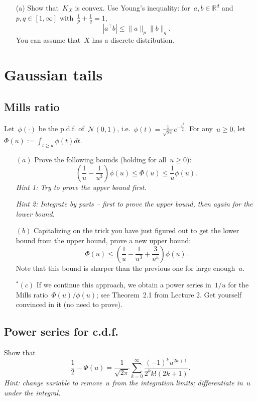 \documentclass[11pt]{article}
\newcommand{\R}{\mathds{R}}
\newcommand{\cN}{\mathcal{N}}
\newcommand{\leqs}{\leqslant}
\newcommand{\geqs}{\geqslant}
\renewcommand{\le}{\leqs}
\renewcommand{\ge}{\geqs}
\begin{document}
\begin{itemize}
\item[(a)]
Show that~$K_X$ is convex. Use Young's inequality: for~$a, b \in \R^d$ and~$p,q \in [1,\infty]$ with~$\frac{1}{p} + \frac{1}{q} = 1$, 
\[
|a^\top b| \le \| a \|_p \|b\|_q.
\]
You can assume that~$X$ has a discrete distribution.
\end{itemize}
\newpage
\noindent
\section{Gaussian tails} 

\subsection{Mills ratio}
Let~$\phi(\cdot)$ be the p.d.f. of~$\cN(0,1)$, i.e.~$\phi(t) = \frac{1}{\sqrt{2\pi}} e^{-\frac{t^2}{2}}$. For any~$u \ge 0$, let~$\Phi(u) := \int_{t \ge u} \phi(t) dt$.
\begin{itemize}
\item[$(a)$]
Prove the following bounds (holding for all~$u \ge 0$):
\[
\left( \frac{1}{u} - \frac{1}{u^3} \right) \phi(u) \le \Phi(u) \le \frac{1}{u} \phi(u).
\]
{\em Hint 1:} {\em Try to prove the upper bound first.}

{\em Hint 2:} {\em Integrate by parts -- first to prove the upper bound, then again for the lower bound.}\\

\item[$(b)$] 
Capitalizing on the trick you have just figured out to get the lower bound from the upper bound, prove a new upper bound:
\[
\Phi(u) \le \left( \frac{1}{u} - \frac{1}{u^3} + \frac{3}{u^5} \right) \phi(u).
\]
Note that this bound is sharper than the previous one for large enough~$u$. 

\item[$^*(c)$]
If we continue this approach, we obtain a power series in~$1/u$ for the Mills ratio~$\Phi(u)/\phi(u)$; see Theorem~2.1 from Lecture 2. 
Get yourself convinced in it (no need to prove).
\end{itemize}

\subsection{Power series for c.d.f.}
Show that
\[
\frac{1}{2} - \Phi(u) = \frac{1}{\sqrt{2\pi}}\sum_{k=0}^{\infty} \frac{(-1)^k u^{2k+1}}{2^k k!(2k+1)}.
\]
{\em Hint: change variable to remove~$u$ from the integration limits; differentiate in~$u$ under the integral.}
\end{document}
